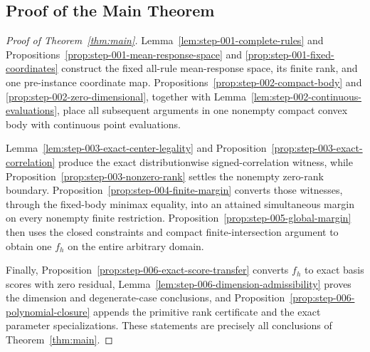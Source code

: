 \subsection{Proof of the Main Theorem}

\begin{proof}[Proof of Theorem~\ref{thm:main}]
Lemma~\ref{lem:step-001-complete-rules} and
Propositions~\ref{prop:step-001-mean-response-space} and
\ref{prop:step-001-fixed-coordinates} construct the fixed all-rule
mean-response space, its finite rank, and one pre-instance coordinate map.
Propositions~\ref{prop:step-002-compact-body} and
\ref{prop:step-002-zero-dimensional}, together with
Lemma~\ref{lem:step-002-continuous-evaluations}, place all subsequent
arguments in one nonempty compact convex body with continuous point
evaluations.

Lemma~\ref{lem:step-003-exact-center-legality} and
Proposition~\ref{prop:step-003-exact-correlation} produce the exact
distributionwise signed-correlation witness, while
Proposition~\ref{prop:step-003-nonzero-rank} settles the nonempty zero-rank
boundary.  Proposition~\ref{prop:step-004-finite-margin} converts those
witnesses, through the fixed-body minimax equality, into an attained
simultaneous margin on every nonempty finite restriction.
Proposition~\ref{prop:step-005-global-margin} then uses the closed constraints
and compact finite-intersection argument to obtain one \(f_h\) on the entire
arbitrary domain.

Finally, Proposition~\ref{prop:step-006-exact-score-transfer} converts
\(f_h\) to exact basis scores with zero residual,
Lemma~\ref{lem:step-006-dimension-admissibility} proves the dimension and
degenerate-case conclusions, and
Proposition~\ref{prop:step-006-polynomial-closure} appends the primitive rank
certificate and the exact parameter specializations.  These statements are
precisely all conclusions of Theorem~\ref{thm:main}.
\end{proof}
